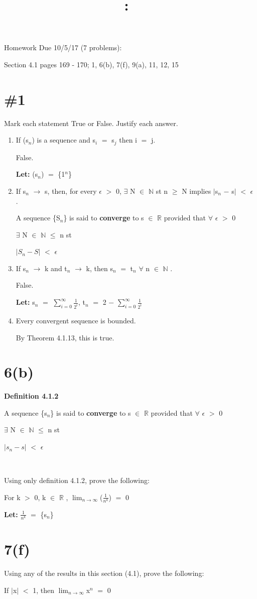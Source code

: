 \documentclass{article}
\title{
    \vspace{2in}
    \textmd{\textbf{\hmwkClass:\ \hmwkTitle}}\\
    \normalsize\vspace{0.1in}\small\vspace{0.1in}\large{\textit{\hmwkClassInstructor}}
    \vspace{3in}
}
\author{\hmwkAuthorName}
\date{}
\newcommand{\mt}[1]{\ensuremath{#1}}
\newcommand\bsc[2][\DefaultOpt]{%
  \def\DefaultOpt{#2}%
  \section[#1]{#2}%
}
\newcommand{\balist}{\begin{enumerate}[label=\alph*.]}
\newcommand{\elist}{\end{enumerate}}
\newcommand{\lt}[1]{\textbf{Let: } #1}
\newcommand{\br}{\mt{\mathbb{R}} }       %
\newcommand{\bn}{\mt{\mathbb{N}} }       %
\newcommand{\ep}{\mt{\epsilon} }         %
\newcommand{\fa}{\mt{\forall} }          %
\newcommand{\mem}{\mt{\in} }
\newcommand{\exs}{\mt{\exists} }
\newcommand{\lra}{ \mt{\longrightarrow} } %
\newcommand{\av}[1]{\mt{|}#1\mt{|}}  %
\newcommand{\prn}[1]{(#1)}
\newcommand{\bk}[1]{\{#1\}}
\newcommand{\ms}{\mt{-} }
\newcommand{\ls}{\mt{<} }
\newcommand{\eql}{\mt{=} }
\newcommand{\uw}[2]{#1\mt{_{#2}}}
\newcommand{\uf}[2]{#1\mt{^{#2}}}
\newcommand{\frc}[2]{\mt{\frac{#1}{#2}}}
\newcommand{\lmti}[1]{\mt{\displaystyle{\lim_{#1 \to \infty}}}}
\begin{document}
Homework Due 10/5/17 (7 problems): 

Section 4.1 pages 169 - 170; 1, 6(b), 7(f), 9(a), 11, 12, 15

\bsc{\#1}{

Mark each statement True or False. Justify each answer.

\balist
\item If (\uw{s}{n}) is a sequence and \uw{s}{i} \eql \uw{s}{j} then i \eql j.
	
	False.
	
	\lt{\prn{\uw{s}{n}}} \eql \bk{\uf{1}{n}}
\item If \uw{s}{n} \lra s, then, for every \ep $>$ 0, \exs N \mem \bn st n $\geq$ N implies $|$\uw{s}{n} $-$ s$|$ $<$ \ep.
	
	A sequence \{\uw{S}{n}\} is said to \textbf{converge} to s \mem \br provided that \fa \ep $>$ 0

	\exs N \mem \bn $\leq$ n st 

	$|\uw{S}{n} - S|$ $<$ \ep \textrm{   } 
\item If \uw{s}{n} \lra k and \uw{t}{n} \lra k, then \uw{s}{n} \eql \uw{t}{n} \fa n \mem \bn.
	
	False.
	
	\lt{\uw{s}{n} \eql $\sum_{i = 0}^\infty$\frc{1}{2^i}, \uw{t}{n} \eql 2 \ms $\sum_{i = 0}^\infty$\frc{1}{2^i} }
\item Every convergent sequence is bounded.
	
	By Theorem 4.1.13, this is true.
\elist
}

\bsc{6(b)}{
\textbf{Definition 4.1.2}

A sequence \{\uw{s}{n}\} is said to \textbf{converge} to s \mem \br provided that \fa \ep $>$ 0

\exs N \mem \bn $\leq$ n st 

$|\uw{s}{n} - s|$ $<$ \ep \textrm{   } \

\

Using only definition 4.1.2, prove the following:

For k $>$ 0, k \mem \br, \lmti{n}(\frc{1}{\uf{n}{k}}) \eql 0

\lt{\frc{1}{n^k} \eql \bk{\uw{s}{n}}}



}

\bsc{7(f)}{

Using any of the results in this section (4.1), prove the following:

If \av{x} \ls 1, then \lmti{n}\uf{x}{n} \eql 0

}
\end{document}
